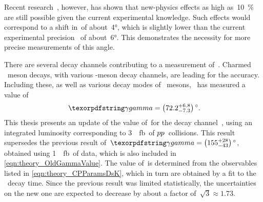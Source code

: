 Recent research~\cite{Brod:2014bfa}, however, has shown that new-physics effects as high as~\SI{10}{\percent} are still possible given the current experimental knowledge.
Such effects would correspond to a shift in~\CPgamma of about~\ang{4}, which is slightly lower than the current experimental precision~\cite{CKMFitter} of about~\ang{6}.
This demonstrates the necessity for more precise measurements of this angle.

There are several decay channels contributing to a measurement of~\CPgamma.
Charmed \Bp~meson decays, with various \D-meson decay channels, are leading for the accuracy.
Including these, as well as various decay modes of \Bd~mesons, \lhcb~has measured a value of~\cite{LHCb-PAPER-2016-032}
%
\begin{equation} \label{eqn:theory_OldGammaValue}
    \CPgamma = \ang[parse-numbers=false]{\left(72.2_{-7.3}^{+6.8}\right)} \rlap{.}
\end{equation}
%
This thesis presents an update of the value of~\CPgamma for the decay channel~\BsDsK, using an integrated luminosity corresponding to \SI{3}{\per\femto\barn}~of \({{p}{p}}\)~collisions.
This result supersedes the previous result of~\({\CPgamma = \ang[parse-numbers=false]{\left(155_{-43}^{+28}\right)}}\), obtained using \SI{1}{\per\femto\barn}~of data, which is also included in \cref{eqn:theory_OldGammaValue}.
The value of~\CPgamma is determined from the observables listed in \cref{eqn:theory_CPParamsDsK}, which in turn are obtained by a fit to the \Bs~decay time.
Since the previous result was limited statistically, the uncertainties on the new one are expected to decrease by about a factor of~\({\sqrt{3} \approx \num{1.73}}\).

